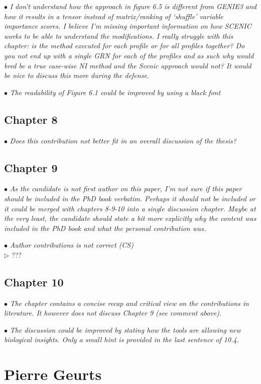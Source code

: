 \documentclass[10pt]{article}
\newcommand{\exam}[2][\  ]{\hspace{0pt}\marginpar{\color{red}#1}$\bullet$ \textit{#2}}
\newcommand{\imp}[1]{{\color{red} #1}}
\newcommand{\nimp}[1]{{\color{gray} #1}}
\newcommand{\answ}[1]{{\color{blue} $\triangleright$ #1}}
\newcommand{\bigexclaim}{\raisebox{-0.1em}{\BigTriangleUp}\hspace{-0.32em}\llap{\small\textbf{!}}\hspace{0.32em}}
\newcommand{\tagimp}{\bigexclaim}
\begin{document}
{\exam{\imp{I don’t understand how the approach in figure 6.5 is different from GENIE3 and
		how it results in a tensor instead of matrix/ranking of ‘shuffle’ variable
		importance scores.} I believe I’m missing important information on how
		SCENIC works to be able to understand the modifications. I really struggle
		with this chapter: is the method executed for each profile or for all profiles
		together? Do you not end up with a single GRN for each of the profiles and as
		such why would bred be a true case-wise NI method and the Scenic approach
		would not? It would be nice to discuss this more during the defense.}


\exam{The readability of Figure 6.1 could be improved by using a black font}
 



\subsection{Chapter 8}
\exam{Does this contribution not better fit in an overall discussion of the thesis?}


\subsection{Chapter 9}
\exam[\tagimp]{\imp{As the candidate is not first author on this paper, I’m not sure if this paper
		should be included in the PhD book verbatim.} Perhaps it should not be
		included or it could be merged with chapters 8-9-10 into a single discussion
		chapter. Maybe at the very least, the candidate should state a bit more
		explicitly why the content was included in the PhD book and what the personal
		contribution was.}

\exam{Author contributions is not correct (CS)} \\
\answ{???}


\subsection{Chapter 10}

\exam{\nimp{The chapter contains a concise recap and critical view on the contributions in
		literature.} It however does not discuss Chapter 9 (see comment above).}


\exam{\imp{The discussion could be improved by stating how the tools are allowing new
		biological insights.} Only a small hint is provided in the last sentence of 10.4.}


\section{Pierre Geurts}

}
\end{document}
